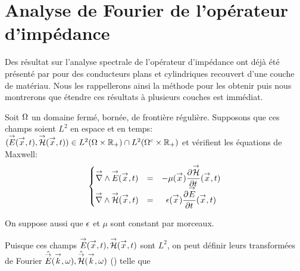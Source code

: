 \section{Analyse de Fourier de l'opérateur d'impédance}

Des résultat sur l'analyse spectrale de l'opérateur d'impédance ont déjà été présenté par \cite{hoppe_impedance_1995} pour des conducteurs plans et cylindriques recouvert d'une couche de matériau.
Nous les rappellerons ainsi la méthode pour les obtenir puis nous montrerons que étendre ces résultats à plusieurs couches est immédiat. 


Soit \(\OO\) un domaine fermé, bornée, de frontière régulière. Supposons que ces champs soient \(L^2\) en espace et en temps: \((\vE(\vect{x},t),\vH(\vect{x},t)) \in L^2(\OO \times \RR_+) \cap L^2(\OO^c\times\RR_+)\) et vérifient les équations de Maxwell:
\begin{equation}
    \left\lbrace
    \begin{matrix}
    \vrot \vE(\vect{x},t) &=& -\mu(\vx) \ddr{t}{\vH}(\vx,t) \\
    \vrot \vH(\vect{x},t) &=& \eps(\vx) \ddr{t}{\vE}(\vx,t)
    \end{matrix}
    \right.
\end{equation}

On suppose aussi que \(\eps\) et \(\mu\) sont constant par morceaux.

Puisque ces champs \(\vE(\vect{x},t),\vH(\vect{x},t)\) sont \(L^2\), on peut définir leurs transformées de Fourier \(\hat{\vE}(\vect{k},\w), \hat{\vH}(\vect{k},\w)\) (\cite[Théorème de Plancherel, p.~153]{yosida_functional_1995}) telle que

